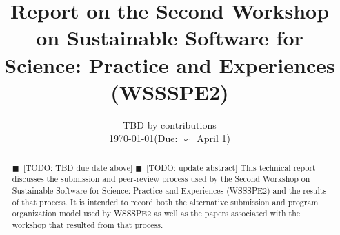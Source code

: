 \documentclass[11pt, oneside]{amsart}
\newcommand{\todo}[1]{{\color{blue}$\blacksquare$~\textsf{[TODO: #1]}}}
\begin{document}
\title[]{Report on the Second Workshop on Sustainable Software for Science: Practice and Experiences (WSSSPE2)} 

\author{TBD by contributions \\{\scriptsize\today \quad  (Due:  $\backsim$ April 1)}}
%
%
%
%  
%
%
%
%
%
%
%


       
\begin{abstract} \todo{TBD due date above}       
\todo{update abstract}
This technical report discusses the submission and peer-review process used by
the Second Workshop on Sustainable Software for Science: Practice and
Experiences (WSSSPE2) and the results of that process. It is intended to record
both the alternative submission and program organization model used by WSSSPE2
as well as the papers associated with the workshop that resulted from that
process.
\end{abstract}


\maketitle
\end{document}
